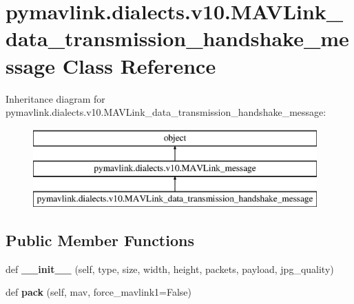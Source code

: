 \hypertarget{classpymavlink_1_1dialects_1_1v10_1_1MAVLink__data__transmission__handshake__message}{}\section{pymavlink.\+dialects.\+v10.\+M\+A\+V\+Link\+\_\+data\+\_\+transmission\+\_\+handshake\+\_\+message Class Reference}
\label{classpymavlink_1_1dialects_1_1v10_1_1MAVLink__data__transmission__handshake__message}
Inheritance diagram for pymavlink.\+dialects.\+v10.\+M\+A\+V\+Link\+\_\+data\+\_\+transmission\+\_\+handshake\+\_\+message\+:\begin{figure}[H]
\begin{center}
\leavevmode
\includegraphics[height=3.000000cm]{classpymavlink_1_1dialects_1_1v10_1_1MAVLink__data__transmission__handshake__message}
\end{center}
\end{figure}
\subsection*{Public Member Functions}
\begin{DoxyCompactItemize}
\item 
\mbox{\label{classpymavlink_1_1dialects_1_1v10_1_1MAVLink__data__transmission__handshake__message_ae3309ed55b8b70a84b180a17292982bf}} 
def {\bfseries \+\_\+\+\_\+init\+\_\+\+\_\+} (self, type, size, width, height, packets, payload, jpg\+\_\+quality)
\item 
\mbox{\label{classpymavlink_1_1dialects_1_1v10_1_1MAVLink__data__transmission__handshake__message_ab31636ddba71f01f68e104deacde975c}} 
def {\bfseries pack} (self, mav, force\+\_\+mavlink1=False)
\end{DoxyCompactItemize}
